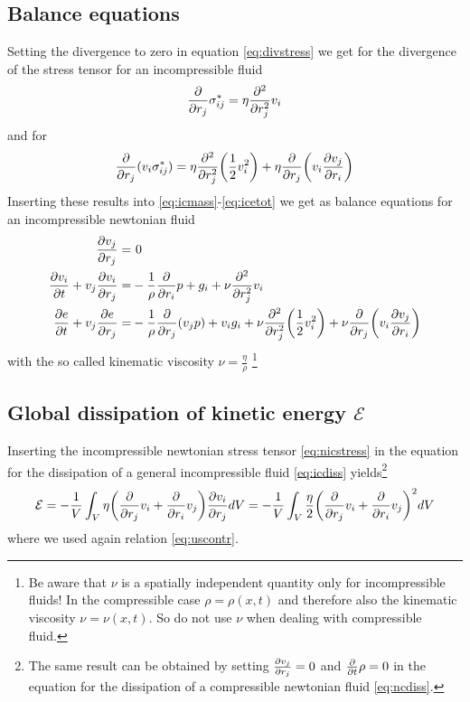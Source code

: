 \subsection{Balance equations}
Setting the divergence to zero in equation \ref{eq:divstress} we get for
the divergence of the stress tensor for an incompressible fluid
\begin{align}
\pd{r_j} \sigma^*_{ij} =\eta \pdd{r_j}v_i \label{eq:nicdivstress}
\end{align}
and for
\begin{align}
\pd{r_j}(v_i \sigma^*_{ij})
=\eta \pdd{r_j}\lra{\frac{1}{2}v_i^2}+\eta\pd{r_j}\lra{v_i\ppd{r_i}{v_j}}
\end{align}
Inserting these results into \eqref{eq:icmass}-\eqref{eq:icetot} we get
as balance equations for an incompressible newtonian fluid
\begin{align}
\ppd{r_j}{v_j} =&\ 0\\
\ppd{t}{v_i} + v_j \ppd{r_j}{v_i} =& -\frac{1}{\rho}\pd{r_i}p + g_i
+\nu\pdd{r_j}v_i\\
\ppd{t}{e} + v_j \ppd{r_j}{e} =& -\frac{1}{\rho} \pd{r_j}(v_j p) + v_i g_i
+\nu \pdd{r_j}\lra{\frac{1}{2}v_i^2}+ \nu \pd{r_j}\lra{v_i\ppd{r_i}{v_j}}
\end{align}
with the so called kinematic viscosity $\nu=\frac{\eta}{\rho}$
\footnote{Be aware that $\nu$ is a spatially independent quantity only 
for incompressible fluids! In the compressible case $\rho=\rho(x,t)$ and
therefore also the kinematic viscosity $\nu=\nu(x,t)$. So do not use $\nu$
when dealing with compressible fluid.}

\subsection{Global dissipation of kinetic energy $\mathcal{E}$}\label{nicdiss}
Inserting the incompressible newtonian stress tensor \eqref{eq:nicstress} 
in the equation for the dissipation of a general incompressible fluid
\ref{eq:icdiss} yields\footnote{The same result can be
obtained by setting $\ppd{r_j}{v_j}=0$ and $\pd{t}\rho=0$ in the equation for
the dissipation of a compressible newtonian fluid \eqref{eq:ncdiss}.}
\begin{align}
\mathcal{E} 
=-\frac{1}{V} \int_V  \eta\lra{\pd{r_j}v_i+\pd{r_i}v_j}\ppd{r_j}{v_i} dV
=-\frac{1}{V} \int_V \frac{\eta}{2}\lra{\pd{r_j}v_i+\pd{r_i}v_j}^2 dV
\end{align}
where we used again relation \ref{eq:uscontr}.

